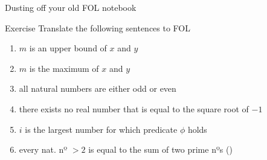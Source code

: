 \documentclass[aspectratio=169]{beamer}
\newenvironment{exercise}
  {\begin{exampleblock}{Exercise}}
  {\end{exampleblock}}
\begin{document}
\begin{frame}{Dusting off your old FOL notebook}

        \begin{exercise}
                Translate the following sentences to FOL
                \begin{enumerate}
                        \item $m$ is an upper bound of $x$ and $y$
                        \item $m$ is the maximum of $x$ and $y$
                        \item all natural numbers are either odd or even
                        \item there exists no real number that is equal
                                to the square root of $-1$
                        \item $i$ is the largest number for which predicate $\phi$
                                holds
                        \item every nat. nº $> 2$ is equal to the sum
                                of two prime nºs  ()
                \end{enumerate}
        \end{exercise}
\end{frame}
\end{document}
